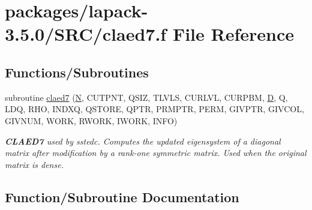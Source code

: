 \hypertarget{claed7_8f}{}\section{packages/lapack-\/3.5.0/\+S\+R\+C/claed7.f File Reference}
\label{claed7_8f}
\subsection*{Functions/\+Subroutines}
\begin{DoxyCompactItemize}
\item 
subroutine \hyperlink{claed7_8f_a349b28e07b331bd74faba7bb36e3ffae}{claed7} (\hyperlink{polmisc_8c_a0240ac851181b84ac374872dc5434ee4}{N}, C\+U\+T\+P\+N\+T, Q\+S\+I\+Z, T\+L\+V\+L\+S, C\+U\+R\+L\+V\+L, C\+U\+R\+P\+B\+M, \hyperlink{odrpack_8h_a7dae6ea403d00f3687f24a874e67d139}{D}, Q, L\+D\+Q, R\+H\+O, I\+N\+D\+X\+Q, Q\+S\+T\+O\+R\+E, Q\+P\+T\+R, P\+R\+M\+P\+T\+R, P\+E\+R\+M, G\+I\+V\+P\+T\+R, G\+I\+V\+C\+O\+L, G\+I\+V\+N\+U\+M, W\+O\+R\+K, R\+W\+O\+R\+K, I\+W\+O\+R\+K, I\+N\+F\+O)
\begin{DoxyCompactList}\small\item\em {\bfseries C\+L\+A\+E\+D7} used by sstedc. Computes the updated eigensystem of a diagonal matrix after modification by a rank-\/one symmetric matrix. Used when the original matrix is dense. \end{DoxyCompactList}\end{DoxyCompactItemize}


\subsection{Function/\+Subroutine Documentation}
\hypertarget{claed7_8f_a349b28e07b331bd74faba7bb36e3ffae}{}
